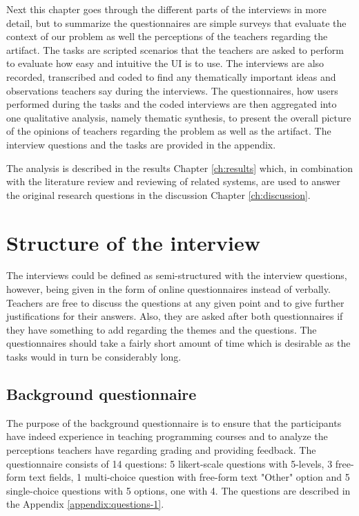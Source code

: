 Next this chapter goes through the different parts of the interviews in more detail, but to summarize the questionnaires are simple surveys that evaluate the context of our problem as well the perceptions of the teachers regarding the artifact. The tasks are scripted scenarios that the teachers are asked to perform to evaluate how easy and intuitive the UI is to use. The interviews are also recorded, transcribed and coded to find any thematically important ideas and observations teachers say during the interviews. The questionnaires, how users performed during the tasks and the coded interviews are then aggregated into one qualitative analysis, namely thematic synthesis, to present the overall picture of the opinions of teachers regarding the problem as well as the artifact. The interview questions and the tasks are provided in the appendix.

The analysis is described in the results Chapter \ref{ch:results} which, in combination with the literature review and reviewing of related systems, are used to answer the original research questions in the discussion Chapter \ref{ch:discussion}.

\section{Structure of the interview}

The interviews could be defined as semi-structured with the interview questions, however, being given in the form of online questionnaires instead of verbally. Teachers are free to discuss the questions at any given point and to give further justifications for their answers. Also, they are asked after both questionnaires if they have something to add regarding the themes and the questions. The questionnaires should take a fairly short amount of time which is desirable as the tasks would in turn be considerably long.

\subsection{Background questionnaire}

The purpose of the background questionnaire is to ensure that the participants have indeed experience in teaching programming courses and to analyze the perceptions teachers have regarding grading and providing feedback. The questionnaire consists of 14 questions: 5 likert-scale questions with 5-levels, 3 free-form text fields, 1 multi-choice question with free-form text "Other" option and 5 single-choice questions with 5 options, one with 4. The questions are described in the Appendix \ref{appendix:questions-1}.

